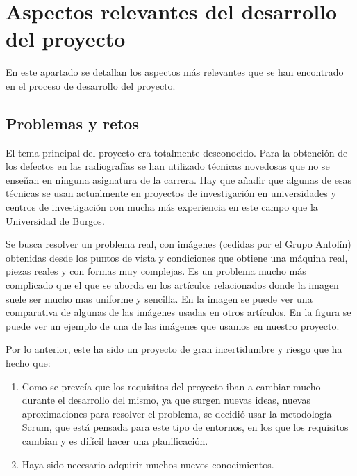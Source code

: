 \chapter{Aspectos relevantes del desarrollo del proyecto}

En este apartado se detallan los aspectos más relevantes que se han encontrado en el proceso de desarrollo del proyecto.

\section{Problemas y retos}
El tema principal del proyecto era totalmente desconocido. Para la obtención de los defectos en las radiografías se han utilizado técnicas novedosas que no se enseñan en ninguna asignatura de la carrera. Hay que añadir que algunas de esas técnicas se usan actualmente en proyectos de investigación en universidades y centros de investigación con mucha más experiencia en este campo que la Universidad de Burgos.

Se busca resolver un problema real, con imágenes (cedidas por el Grupo Antolín) obtenidas desde los puntos de vista y condiciones que obtiene una máquina real, piezas reales y con formas muy complejas. Es un problema mucho más complicado que el que se aborda en los artículos relacionados donde la imagen suele ser mucho mas uniforme y sencilla. En la imagen  se puede ver una comparativa de algunas de las imágenes usadas en otros artículos. En la figura  se puede ver un ejemplo de una de las imágenes que usamos en nuestro proyecto.

Por lo anterior, este ha sido un proyecto de gran incertidumbre y riesgo que ha hecho que:

\begin{enumerate}
\item Como se preveía que los requisitos del proyecto iban a cambiar mucho durante el desarrollo del mismo, ya que surgen nuevas ideas, nuevas aproximaciones para resolver el problema, se decidió usar la metodología Scrum, que está pensada para este tipo de entornos, en los que los requisitos cambian y es difícil hacer una planificación.

\item Haya sido necesario adquirir muchos nuevos conocimientos.
\end{enumerate}

